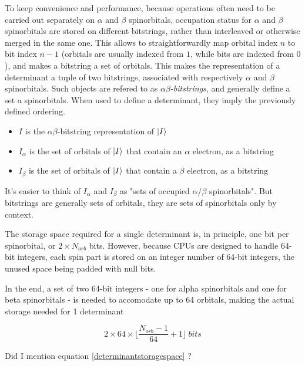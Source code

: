 To keep convenience and performance, because operations often need to be carried out separately on $\alpha$ and $\beta$ spinorbitals, occupation status for $\alpha$ and $\beta$ spinorbitals are stored on different bitstrings, rather than interleaved or otherwise merged in the same one. This allows to straightforwardly map orbital index $n$ to bit index $n-1$ (orbitals are usually indexed from $1$, while bits are indexed from $0$), and makes a bitstring a set of orbitals.
This makes the representation of a determinant a tuple of two bitstrings, associated with respectively $\alpha$ and $\beta$ spinorbitals. Such objects are refered to as \emph{$\alpha \beta$-bitstrings}, and generally define a set a spinorbitals. When used to define a determinant, they imply the previously defined ordering.


\begin{itemize}
\item
$I$ is the $\alpha \beta$-bitstring representation of $\ket I$
\item
$I_\alpha$ is the set of orbitals of $\ket I$ that contain an $\alpha$ electron, as a bitstring
\item
$I_\beta$ is the set of orbitals of $\ket I$ that contain a $\beta$ electron, as a bitstring

\end{itemize}
It's easier to think of $I_\alpha$ and $I_\beta$ as "sets of occupied $\alpha$/$\beta$ spinorbitals". But bitstrings are generally sets of orbitals, they are sets of spinorbitals only by context.


The storage space required for a single determinant is, in principle, one bit per spinorbital, or $2 \times N_{orb}$ bits. However, because CPUs are designed to handle 64-bit integers, each spin part is stored on an integer number of 64-bit integers, the unused space being padded with null bits. 


In the end, a set of two 64-bit integers - one for alpha spinorbitals and one for beta spinorbitals - is needed to accomodate up to 64 orbitals, making the actual storage needed for 1 determinant



\begin{equation}
2 \times 64 \times  \big \lfloor \frac{N_{orb}-1}{64} + 1 \big \rfloor \ bits
\label{determinantstoragespace}
\end{equation}

Did I mention equation \eqref{determinantstoragespace} ?

